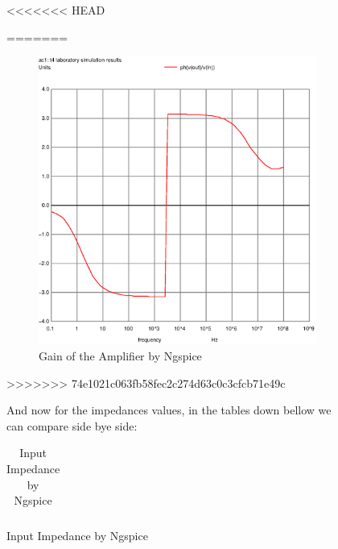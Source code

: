 \begin{figure} [!htb]
<<<<<<< HEAD




=======
\FloatBarrier
\begin{figure}
  \includegraphics{gain2.ps}
  \caption{Gain of the Amplifier by Ngspice}
  \label{}
\end{figure}
\FloatBarrier
>>>>>>> 74e1021c063fb58fec2c274d63c0c3cfcb71e49c

And now for the impedances values, in the tables down bellow we can compare side bye side:
\FloatBarrier
\begin{table}[h]
  \centering
  \begin{tabular}{|c|}
    \hline    
    
    \hline
  \end{tabular}
  \caption{Input Impedance by Ngspice}
  \label{tab:Spice1}
\end{table}
\FloatBarrier   

%    


\end{figure}
